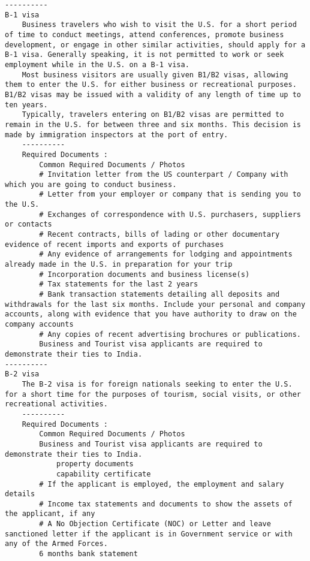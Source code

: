\documentclass[oneside, article]{memoir}
\begin{document}
\begin{verbatim}
----------
B-1 visa
    Business travelers who wish to visit the U.S. for a short period of time to conduct meetings, attend conferences, promote business development, or engage in other similar activities, should apply for a B-1 visa. Generally speaking, it is not permitted to work or seek employment while in the U.S. on a B-1 visa.
    Most business visitors are usually given B1/B2 visas, allowing them to enter the U.S. for either business or recreational purposes. B1/B2 visas may be issued with a validity of any length of time up to ten years.
    Typically, travelers entering on B1/B2 visas are permitted to remain in the U.S. for between three and six months. This decision is made by immigration inspectors at the port of entry.
    ----------
    Required Documents :
        Common Required Documents / Photos
        # Invitation letter from the US counterpart / Company with which you are going to conduct business.
        # Letter from your employer or company that is sending you to the U.S.
        # Exchanges of correspondence with U.S. purchasers, suppliers or contacts
        # Recent contracts, bills of lading or other documentary evidence of recent imports and exports of purchases
        # Any evidence of arrangements for lodging and appointments already made in the U.S. in preparation for your trip
        # Incorporation documents and business license(s)
        # Tax statements for the last 2 years
        # Bank transaction statements detailing all deposits and withdrawals for the last six months. Include your personal and company accounts, along with evidence that you have authority to draw on the company accounts
        # Any copies of recent advertising brochures or publications.
        Business and Tourist visa applicants are required to demonstrate their ties to India.
----------
B-2 visa
    The B-2 visa is for foreign nationals seeking to enter the U.S. for a short time for the purposes of tourism, social visits, or other recreational activities.
    ----------
    Required Documents :
        Common Required Documents / Photos
        Business and Tourist visa applicants are required to demonstrate their ties to India.
            property documents
            capability certificate
        # If the applicant is employed, the employment and salary details
        # Income tax statements and documents to show the assets of the applicant, if any
        # A No Objection Certificate (NOC) or Letter and leave sanctioned letter if the applicant is in Government service or with any of the Armed Forces.
        6 months bank statement
       

\end{verbatim}
\end{document}
